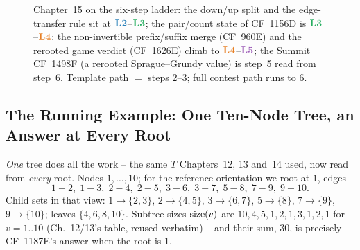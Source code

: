 \begin{figure}[H]
\centering
{}
\caption*{Chapter~15 on the six-step ladder: the down/up split and the
edge-transfer rule sit at $\lv2$--$\lv3$; the pair/count state of CF~1156D is
$\lv3$--$\lv4$; the non-invertible prefix/suffix merge (CF~960E) and the
rerooted game verdict (CF~1626E) climb to $\lv4$--$\lv5$; the Summit CF~1498F
(a rerooted Sprague--Grundy value) is step~5 read from step~6.  Template path
$=$ steps 2--3; full contest path runs to 6.}
\end{figure}

\subsection*{The Running Example: One Ten-Node Tree, an Answer at Every Root}

\emph{One} tree does all the work -- the same $T$ Chapters~12, 13 and~14 used,
now read from \emph{every} root.  Nodes $1,\dots,10$; for the reference
orientation we root at $1$, edges
\[
  1\!-\!2,\; 1\!-\!3,\; 2\!-\!4,\; 2\!-\!5,\; 3\!-\!6,\; 3\!-\!7,\; 5\!-\!8,\; 7\!-\!9,\; 9\!-\!10 .
\]
Child sets in that view: $1\!\to\!\{2,3\}$, $2\!\to\!\{4,5\}$,
$3\!\to\!\{6,7\}$, $5\!\to\!\{8\}$, $7\!\to\!\{9\}$, $9\!\to\!\{10\}$; leaves
$\{4,6,8,10\}$.  Subtree sizes $\operatorname{size}(v)$ are $10,4,5,1,2,1,3,1,2,1$ for
$v=1..10$ (Ch.~12/13's table, reused verbatim) -- and their sum,
$30$, is precisely CF~1187E's answer when the root is $1$.

